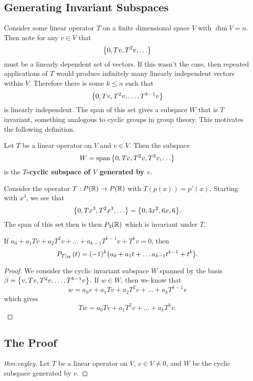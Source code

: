 \documentclass{subfiles}
\begin{document}
\subsection{Generating Invariant Subspaces}

Consider some linear operator $T$ on a finite dimensional space $V$ with $\dim V = n$. Then note for any $v \in V$ that
\[
    \qty{0, T v, T^2 v, \ldots}
\]
must be a linearly dependent set of vectors. If this wasn't the case, then repeated applications of $T$ would produce infinitely many linearly independent vectors within $V$. Therefore there is some $k \leq n$ such that
\[
    \qty{0, Tv, T^2 v, \ldots, T^{k-1} v}
\]
is linearly independent. The span of this set gives a subspace $W$ that is $T$ invariant, something analogous to cyclic groups in group theory. This motivates the following definition.

\begin{definition}
    Let $T$ be a linear operator on $V$ and $v \in V$. Then the subspace
    \[
        W = \operatorname{span}\qty{0, Tv, T^2 v, T^3 v, \ldots}
    \]
    is the \textbf{$T$-cyclic subspace of $V$ generated by $v$}.
\end{definition}

\begin{example}
    Consider the operator $T : P(\mathbb{R}) \to P(\mathbb{R})$ with $T(p(x)) = p'(x)$. Starting with $x^3$, we see that
    \[
        \qty{0, Tx^3, T^2 x^3, \ldots} = \qty{0, 3x^2, 6x, 6}
    .\]
    The span of this set then is then $P_3(\mathbb{R})$ which is invariant under $T$.
\end{example}

\begin{theorem}
    If $a_0 + a_1 Tv + a_2 T^2 v + \ldots + a_{k-1} T^{k-1} v + T^k v = 0$, then
    \[
        P_{T|_W}(t) = (-1)^k \qty(a_0 + a_1 t + \ldots a_{k-1} t^{k-1} + t^k)
    .\]
\end{theorem}

\begin{proof}
    We consider the cyclic invariant subspace $W$ spanned by the basis $\beta = \qty{v, Tv, T^2 v, \ldots, T^{k-1} v}$. If $w \in W$, then we know that
    \[
        w = a_0 v + a_1 T v + a_2 T^2 v + \ldots + a_k T^{k-1} v
    \]
    which gives
    \[
        T w = a_0 T v + a_1 T^2 v + \ldots + a_k T^k v
    .\]
\end{proof}

\subsection{The Proof}

\begin{proof}[thm:cayley]
    Let $T$ be a linear operator on $V$, $v \in V \neq 0$, and $W$ be the cyclic subspace generated by $v$.
\end{proof}
\end{document}
